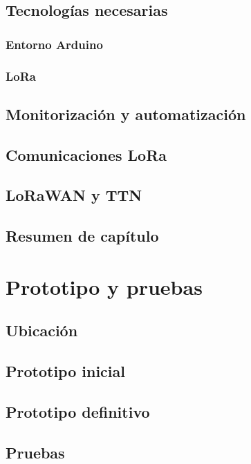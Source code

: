 \documentclass[12pt]{article}
\begin{document}
	\subsection[Tecnologías necesarias]{Tecnologías necesarias}
	\subsubsection[Entorno Arduino]{Entorno Arduino}
	\subsubsection[LoRa]{LoRa}
	\subsection[Monitorización y automatización]{Monitorización y automatización}
	\subsection[Comunicaciones LoRa]{Comunicaciones LoRa}
	\subsection[LoRaWAN y TTN]{LoRaWAN y TTN}
	\subsection[Resumen del capítulo]{Resumen de capítulo}
	
	\pagebreak
	
	\section[Prototipo y pruebas]{Prototipo y pruebas}
	\subsection[Ubicación]{Ubicación}
	\subsection[Prototipo inicial]{Prototipo inicial}
	\subsection[Prototipo definitivo]{Prototipo definitivo}
	\subsection[Pruebas]{Pruebas}
\end{document}
